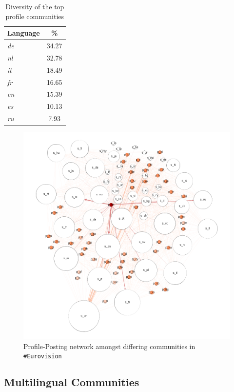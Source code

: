 \begin{table}[!htb]
\centering
\begin{tabular}{@{}lc}
\toprule
\textbf{Language} & \textbf{\%} \\ 
\midrule
{\emph{de}} & 34.27 \\
{\emph{nl}} & 32.78 \\
{\emph{it}} & 18.49 \\ 
{\emph{fr}} & 16.65 \\
{\emph{en}} & 15.39 \\
{\emph{es}} & 10.13 \\
{\emph{ru}} & 7.93 \\
\bottomrule
\end{tabular}
\caption{Diversity of the top profile communities}
\label{tbl:diversity}
\end{table}

\begin{figure}[htb]
\centering
\includegraphics[width=\columnwidth]{images/euro_pslang_nsl.png}
\caption{Profile-Posting network amongst differing communities in {\texttt{\#Eurovision}}}
\label{fig:eurovisionpslangnsl}
\end{figure}

\subsection{Multilingual Communities}

